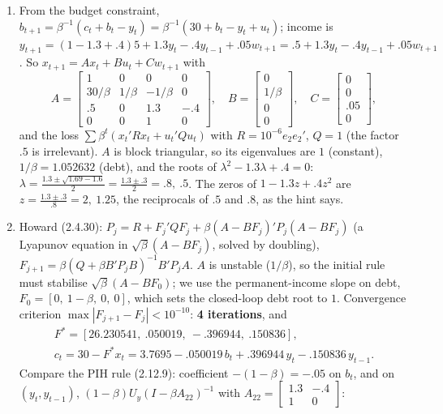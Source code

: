 \documentclass[12pt, letterpaper]{article}
\begin{document}
\begin{tcolorbox}[oddbox,title={Exercise 2.13 \quad Permanent Income by Howard Improvement}]
\begin{enumerate}
\item From the budget constraint, $b_{t+1}=\beta^{-1}(c_t+b_t-y_t)=\beta^{-1}(30+b_t-y_t+u_t)$; income
is $y_{t+1}=(1-1.3+.4)5+1.3y_t-.4y_{t-1}+.05w_{t+1}=.5+1.3y_t-.4y_{t-1}+.05w_{t+1}$. So
$x_{t+1}=Ax_t+Bu_t+Cw_{t+1}$ with
\[
A=\begin{bmatrix}1&0&0&0\\30/\beta&1/\beta&-1/\beta&0\\.5&0&1.3&-.4\\0&0&1&0\end{bmatrix},\quad
B=\begin{bmatrix}0\\1/\beta\\0\\0\end{bmatrix},\quad
C=\begin{bmatrix}0\\0\\.05\\0\end{bmatrix},
\]
and the loss $\sum\beta^t(x_t'Rx_t+u_t'Qu_t)$ with $R=10^{-6}e_2e_2'$, $Q=1$ (the factor $.5$ is
irrelevant). $A$ is block triangular, so its eigenvalues are $1$ (constant), $1/\beta=1.052632$
(debt), and the roots of $\lambda^2-1.3\lambda+.4=0$: $\lambda=\frac{1.3\pm\sqrt{1.69-1.6}}{2}
=\frac{1.3\pm.3}2=\boxed{.8,\ .5}$. The zeros of $1-1.3z+.4z^2$ are
$z=\frac{1.3\pm.3}{.8}=\boxed{2,\ 1.25}$, the reciprocals of $.5$ and $.8$, as the hint says.
\item Howard (2.4.30): $P_j=R+F_j'QF_j+\beta(A-BF_j)'P_j(A-BF_j)$ (a Lyapunov equation in
$\sqrt\beta(A-BF_j)$, solved by doubling), $F_{j+1}=\beta(Q+\beta B'P_jB)^{-1}B'P_jA$. $A$ is unstable
($1/\beta$), so the initial rule must stabilise $\sqrt\beta(A-BF_0)$; we use the permanent-income slope
on debt, $F_0=[0,\ 1-\beta,\ 0,\ 0]$, which sets the closed-loop debt root to $1$. Convergence
criterion $\max|F_{j+1}-F_j|<10^{-10}$: \textbf{4 iterations}, and
\[
\begin{gathered}
F^*=[26.230541,\ .050019,\ -.396944,\ .150836],\\
c_t=30-F^*x_t=3.7695-.050019\,b_t+.396944\,y_t-.150836\,y_{t-1}.
\end{gathered}
\]
Compare the PIH rule (2.12.9): coefficient $-(1-\beta)=-.05$ on $b_t$, and on $(y_t,y_{t-1})$,
$(1-\beta)U_y(I-\beta A_{22})^{-1}$ with $A_{22}=\begin{bmatrix}1.3&-.4\\1&0\end{bmatrix}$:

\end{enumerate}
\end{tcolorbox}
\end{document}
